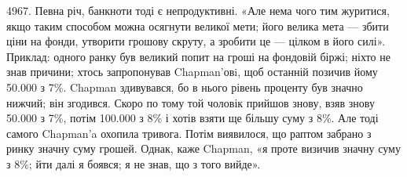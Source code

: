 4967. Певна річ, банкноти тоді є непродуктивні. «Але нема чого тим
журитися, якщо таким способом можна осягнути великої мети; його велика
мета — збити ціни на фонди, утворити грошову скруту, а зробити це — цілком
в його силі». Приклад: одного ранку був великий попит на гроші на фондовій
біржі; ніхто не знав причини; хтось запропонував Chapman’овi, щоб останній
позичив йому \num{50.000} з 7\%. Chapman здивувався, бо в нього рівень
проценту був значно нижчий; він згодився. Скоро по тому той чоловік прийшов
знову, взяв знову \num{50.000} з 7\%, потім \num{100.000} з 8\% і хотів
взяти ще більшу суму з 8\%. Але тоді самого Chapman’a охопила тривога.
Потім виявилося, що раптом забрано з ринку значну суму грошей. Однак, каже
Chapman, «я проте визичив значну суму з 8\%; йти далі я боявся; я не знав,
що з того вийде».

